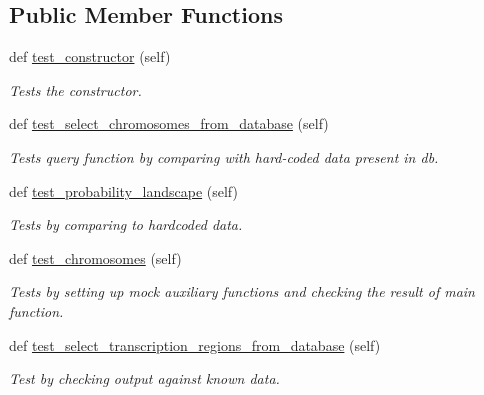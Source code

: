 \subsection*{Public Member Functions}
\begin{DoxyCompactItemize}
\item 
def \mbox{\hyperlink{classReDyMo_1_1test_1_1test__data__manager_1_1TestGenome_abd5b5058c8f3a1b169df451dfb8710de}{test\+\_\+constructor}} (self)
\begin{DoxyCompactList}\small\item\em Tests the constructor. \end{DoxyCompactList}\item 
def \mbox{\hyperlink{classReDyMo_1_1test_1_1test__data__manager_1_1TestGenome_a90f1192e9c92f039fcb35be8c2a95f61}{test\+\_\+select\+\_\+chromosomes\+\_\+from\+\_\+database}} (self)
\begin{DoxyCompactList}\small\item\em Tests query function by comparing with hard-\/coded data present in db. \end{DoxyCompactList}\item 
def \mbox{\hyperlink{classReDyMo_1_1test_1_1test__data__manager_1_1TestGenome_a365fd8223cd09983d221eed381ad53a4}{test\+\_\+probability\+\_\+landscape}} (self)
\begin{DoxyCompactList}\small\item\em Tests by comparing to hardcoded data. \end{DoxyCompactList}\item 
\mbox{\label{classReDyMo_1_1test_1_1test__data__manager_1_1TestGenome_a7be0d122b4381b67e444e1ae2aad0924}} 
def \mbox{\hyperlink{classReDyMo_1_1test_1_1test__data__manager_1_1TestGenome_a7be0d122b4381b67e444e1ae2aad0924}{test\+\_\+chromosomes}} (self)
\begin{DoxyCompactList}\small\item\em Tests by setting up mock auxiliary functions and checking the result of main function. \end{DoxyCompactList}\item 
\mbox{\label{classReDyMo_1_1test_1_1test__data__manager_1_1TestGenome_a383259d970bed49788e54fa09d3035d7}} 
def \mbox{\hyperlink{classReDyMo_1_1test_1_1test__data__manager_1_1TestGenome_a383259d970bed49788e54fa09d3035d7}{test\+\_\+select\+\_\+transcription\+\_\+regions\+\_\+from\+\_\+database}} (self)
\begin{DoxyCompactList}\small\item\em Test by checking output against known data. \end{DoxyCompactList}\end{DoxyCompactItemize}
